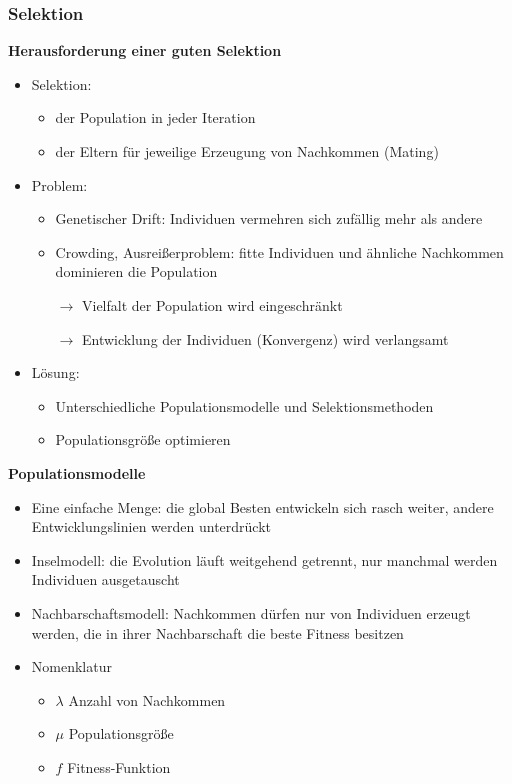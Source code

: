 \subsubsection{Selektion}
\textbf{Herausforderung einer guten Selektion}
\begin{itemize}
	\item Selektion:
	\begin{itemize}
		\item der Population in jeder Iteration
		\item der Eltern für jeweilige Erzeugung von Nachkommen (Mating)
	\end{itemize}
	\item Problem:
	\begin{itemize}
		\item Genetischer Drift: Individuen vermehren sich zufällig mehr als andere
		\item Crowding, Ausreißerproblem: \glqq fitte\grqq{} Individuen und ähnliche Nachkommen dominieren die Population
		\item[$\rightarrow$] Vielfalt der Population wird eingeschränkt
		\item[$\rightarrow$] Entwicklung der Individuen (Konvergenz) wird verlangsamt
	\end{itemize}
	\item Lösung:
	\begin{itemize}
		\item Unterschiedliche Populationsmodelle und Selektionsmethoden
		\item Populationsgröße optimieren
	\end{itemize}
\end{itemize}
%
\textbf{Populationsmodelle}
\begin{itemize}
	\item Eine einfache Menge: die global Besten entwickeln sich rasch weiter, andere Entwicklungslinien werden unterdrückt
	\item Inselmodell: die Evolution läuft weitgehend getrennt, nur manchmal werden Individuen ausgetauscht
	\item Nachbarschaftsmodell: Nachkommen dürfen nur von Individuen erzeugt werden, die in ihrer Nachbarschaft die beste Fitness besitzen
	\item Nomenklatur
	\begin{itemize}
		\item $\lambda$ Anzahl von Nachkommen
		\item $\mu$ Populationsgröße
		\item $f$ Fitness-Funktion
	\end{itemize}
\end{itemize}
